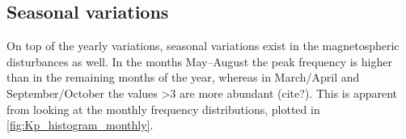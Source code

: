 \subsection{Seasonal variations}
On top of the yearly variations, seasonal variations exist in the magnetospheric disturbances as well. In the months May--August the \Kp{} peak frequency is higher than in the remaining months of the year, whereas in March/April and September/October the \Kp{} values \num{>3} are more abundant (cite?). This is apparent from looking at the monthly \Kp{} frequency distributions, plotted in \autoref{fig:Kp_histogram_monthly}.
\begin{figure}[htb]
	\begin{floatrow}
\end{floatrow}
\end{figure}
